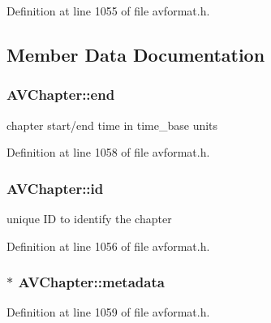 Definition at line 1055 of file avformat.\+h.



\subsection{Member Data Documentation}
\subsubsection[{\texorpdfstring{end}{end}}]{ A\+V\+Chapter\+::end}\hypertarget{struct_a_v_chapter_ab68f32dc07fac89b4364e86483b00f3e}{}\label{struct_a_v_chapter_ab68f32dc07fac89b4364e86483b00f3e}


chapter start/end time in time\+\_\+base units 



Definition at line 1058 of file avformat.\+h.

\subsubsection[{\texorpdfstring{id}{id}}]{ A\+V\+Chapter\+::id}\hypertarget{struct_a_v_chapter_a2a48026c205e948f8bfaafe92d41f752}{}\label{struct_a_v_chapter_a2a48026c205e948f8bfaafe92d41f752}


unique ID to identify the chapter 



Definition at line 1056 of file avformat.\+h.

\subsubsection[{\texorpdfstring{metadata}{metadata}}]{$\ast$ A\+V\+Chapter\+::metadata}\hypertarget{struct_a_v_chapter_a998ea9c9f86547970d58f0b405d55332}{}\label{struct_a_v_chapter_a998ea9c9f86547970d58f0b405d55332}


Definition at line 1059 of file avformat.\+h.

